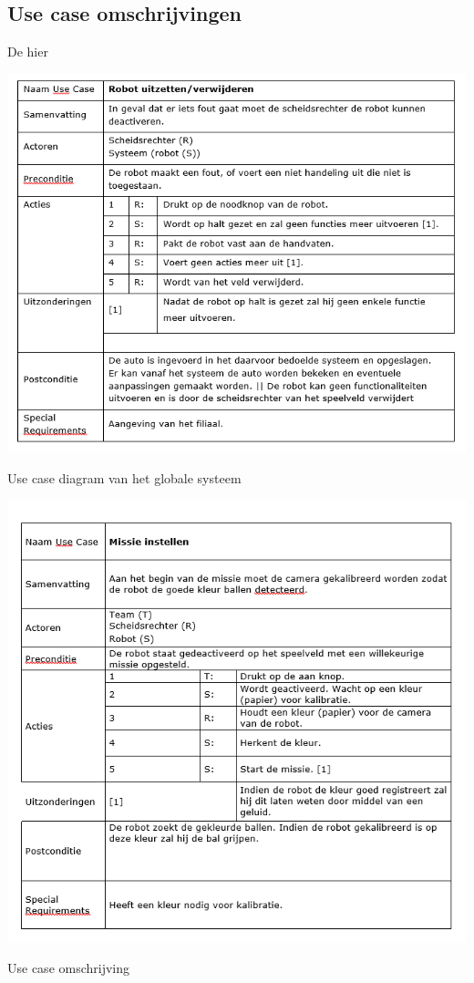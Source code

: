 \documentclass[12pt]{article} %
\begin{document}
\subsection{Use case omschrijvingen}
De hier
\begin{center}
\begin{table}[H]
\includegraphics[scale=.9]{uc1.png}
\caption{Use case diagram van het globale systeem}
\label{tbl:usecase1}
\end{table}
\end{center}

\begin{center}
\begin{table}
\includegraphics[scale=.9]{uc2.png}
\caption{Use case omschrijving}
\label{fig:usecase2}
\end{table}
\end{center}
\end{document}
